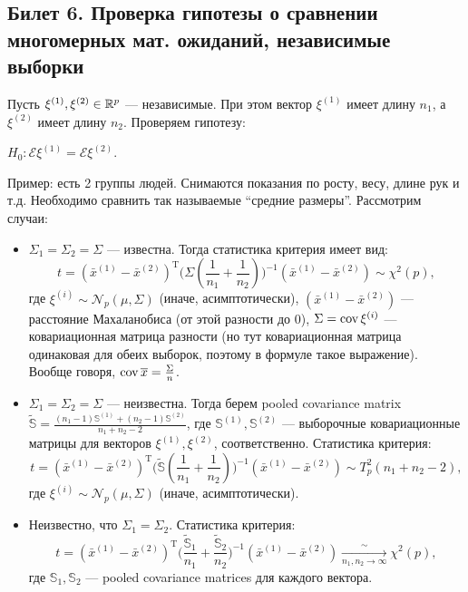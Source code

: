 \subsection{Билет 6. Проверка гипотезы о сравнении многомерных мат. ожиданий, независимые выборки}
Пусть $\xi^{(1)}, \xi^{(2)} \in \mathbb{R}^p$  --- независимые. При этом вектор $\xi^{(1)}$ имеет длину $n_1$, а $\xi^{(2)}$ имеет длину $n_2$. Проверяем гипотезу:

$H_0: \mathcal{E}\xi^{(1)} = \mathcal{E}\xi^{(2)}$.

Пример: есть 2 группы людей. Снимаются показания по росту, весу, длине рук и т.д. Необходимо сравнить так называемые ``средние размеры''. Рассмотрим случаи:
\begin{itemize}
\item $\Sigma_1 = \Sigma_2 = \Sigma$ --- известна. Тогда статистика критерия имеет вид:
%
\begin{equation*}
t = (\bar{x}^{(1)} - \bar{x}^{(2)})^{\mathrm{T}} \Big (\Sigma (\frac{1}{n_1} + \frac{1}{n_2}) \Big )^{-1} (\bar{x}^{(1)} - \bar{x}^{(2)}) \sim \chi^2 (p),
\end{equation*}
%
где $\xi^{(i)} \sim \mathcal{N}_p (\mu,\Sigma)$ (иначе, асимптотически), $(\bar{x}^{(1)} - \bar{x}^{(2)})$ --- расстояние Махаланобиса (от этой разности до 0), $\Sigma = \operatorname{cov} \xi^{(i)}$ --- ковариационная матрица разности (но тут ковариационная матрица одинаковая для обеих выборок, поэтому в формуле такое выражение). Вообще говоря, $\operatorname{cov} \overline{x} = \frac{\Sigma}{n}$.
\item $\Sigma_1 = \Sigma_2 = \Sigma$ --- неизвестна. Тогда берем pooled covariance matrix $\tilde{\mathbb{S}} = \frac{(n_1 - 1)\mathbb{S}^{(1)} + (n_2 - 1)\mathbb{S}^{(2)}}{n_1 + n_2 - 2}$, где $\mathbb{S}^{(1)}, \mathbb{S}^{(2)}$ --- выборочные ковариационные матрицы для векторов $\xi^{(1)}, \xi^{(2)}$, соответственно.
Статистика критерия:
%
\begin{equation*}
t = (\bar{x}^{(1)} - \bar{x}^{(2)})^{\mathrm{T}} \Big (\tilde{\mathbb{S}} (\frac{1}{n_1} +
\frac{1}{n_2}) \Big )^{-1} (\bar{x}^{(1)} - \bar{x}^{(2)}) \sim T_p^2 (n_1+n_2-2),
\end{equation*}
%
где $\xi^{(i)} \sim \mathcal{N}_p (\mu,\Sigma)$ (иначе, асимптотически).
\item Неизвестно, что $\Sigma_1 = \Sigma_2$.
Статистика критерия:
%
\begin{equation*}
t = (\bar{x}^{(1)} - \bar{x}^{(2)})^{\mathrm{T}} \Big (\frac{\tilde{\mathbb{S}}_1}{n_1} +
\frac{\tilde{\mathbb{S}}_2}{n_2} \Big )^{-1} (\bar{x}^{(1)} - \bar{x}^{(2)}) \xrightarrow[n_1, n_2
\rightarrow \infty]{\sim} \chi^2 (p),
\end{equation*}
%
где $\mathbb{S}_1, \mathbb{S}_2$ --- pooled covariance matrices для каждого вектора.
\end{itemize}
